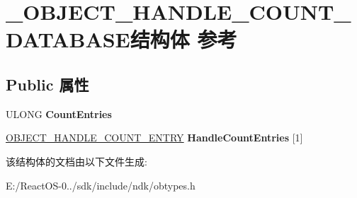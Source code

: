 \hypertarget{struct___o_b_j_e_c_t___h_a_n_d_l_e___c_o_u_n_t___d_a_t_a_b_a_s_e}{}\section{\+\_\+\+O\+B\+J\+E\+C\+T\+\_\+\+H\+A\+N\+D\+L\+E\+\_\+\+C\+O\+U\+N\+T\+\_\+\+D\+A\+T\+A\+B\+A\+S\+E结构体 参考}
\label{struct___o_b_j_e_c_t___h_a_n_d_l_e___c_o_u_n_t___d_a_t_a_b_a_s_e}
\subsection*{Public 属性}
\begin{DoxyCompactItemize}
\item 
\mbox{\label{struct___o_b_j_e_c_t___h_a_n_d_l_e___c_o_u_n_t___d_a_t_a_b_a_s_e_a7351acf45ac2c04497c2961c151e288e}} 
U\+L\+O\+NG {\bfseries Count\+Entries}
\item 
\mbox{\label{struct___o_b_j_e_c_t___h_a_n_d_l_e___c_o_u_n_t___d_a_t_a_b_a_s_e_a6b047baf17d6170fd15df039005f46c0}} 
\hyperlink{struct___o_b_j_e_c_t___h_a_n_d_l_e___c_o_u_n_t___e_n_t_r_y}{O\+B\+J\+E\+C\+T\+\_\+\+H\+A\+N\+D\+L\+E\+\_\+\+C\+O\+U\+N\+T\+\_\+\+E\+N\+T\+RY} {\bfseries Handle\+Count\+Entries} \mbox{[}1\mbox{]}
\end{DoxyCompactItemize}


该结构体的文档由以下文件生成\+:\begin{DoxyCompactItemize}
\item 
E\+:/\+React\+O\+S-\/0../sdk/include/ndk/obtypes.\+h\end{DoxyCompactItemize}
